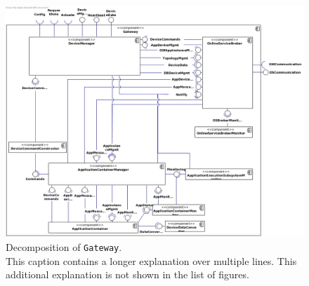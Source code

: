 
\showdecompnotes{}


\begin{landscape}
    \begin{figure}[!htp]
    	\centering
    	\includegraphics[width=\linewidth]{images/component-diagram-Gateway}
    	\caption[Decomposition of \texttt{Gateway}]{Decomposition of \texttt{Gateway}.\\
    	This caption contains a longer explanation over multiple lines. This additional explanation is not shown in the list of figures.}\label{fig:decomp-component1}
    \end{figure}
\end{landscape}

